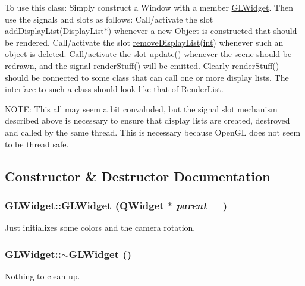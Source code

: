 To use this class: Simply construct a Window with a member \hyperlink{class_g_l_widget}{GLWidget}. Then use the signals and slots as follows: Call/activate the slot addDisplayList(DisplayList$\ast$) whenever a new Object is constructed that should be rendered. Call/activate the slot \hyperlink{class_g_l_widget_a8b370af6f9b50bb5ae868664fd94eae6}{removeDisplayList(int)} whenever such an object is deleted. Call/activate the slot \hyperlink{class_g_l_widget_a6c9d382ddf46097bccb2b69410f7563e}{update()} whenever the scene should be redrawn, and the signal \hyperlink{class_g_l_widget_aee1d7cc90f004a93605b3aa795efd75e}{renderStuff()} will be emitted. Clearly \hyperlink{class_g_l_widget_aee1d7cc90f004a93605b3aa795efd75e}{renderStuff()} should be connected to some class that can call one or more display lists. The interface to such a class should look like that of RenderList.

NOTE: This all may seem a bit convaluded, but the signal slot mechanism described above is necessary to ensure that display lists are created, destroyed and called by the same thread. This is necessary because OpenGL does not seem to be thread safe. 

\subsection{Constructor \& Destructor Documentation}
\hypertarget{class_g_l_widget_ab79c391c86de1ffb76f6950b49d82c0c}{
\subsubsection[{GLWidget}]{\setlength{\rightskip}{0pt plus 5cm}GLWidget::GLWidget (QWidget $\ast$ {\em parent} = {})}}
\label{class_g_l_widget_ab79c391c86de1ffb76f6950b49d82c0c}


Just initializes some colors and the camera rotation. \hypertarget{class_g_l_widget_a535192a4262b4501e5493303834f45d3}{
\subsubsection[{$\sim$GLWidget}]{\setlength{\rightskip}{0pt plus 5cm}GLWidget::$\sim$GLWidget ()}}
\label{class_g_l_widget_a535192a4262b4501e5493303834f45d3}


Nothing to clean up. 

